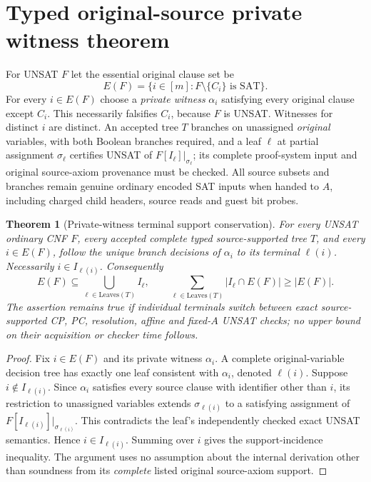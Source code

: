 \documentclass[11pt]{article}
\newtheorem{theorem}{Theorem}
\begin{document}
\section{Typed original-source private witness theorem}
For UNSAT $F$ let the essential original clause set be
\[
E(F)=\{i\in[m]:F\setminus\{C_i\}\text{ is SAT}\}.
\]
For every $i\in E(F)$ choose a \emph{private witness} $\alpha_i$ satisfying every original clause except $C_i$. This necessarily falsifies $C_i$, because $F$ is UNSAT. Witnesses for distinct $i$ are distinct. An accepted tree $T$ branches on unassigned \emph{original} variables, with both Boolean branches required, and a leaf $\ell$ at partial assignment $\sigma_\ell$ certifies UNSAT of $F[I_\ell]|_{\sigma_\ell}$; its complete proof-system input and original source-axiom provenance must be checked. All source subsets and branches remain genuine ordinary encoded SAT inputs when handed to $A$, including charged child headers, source reads and guest bit probes.

\begin{theorem}[Private-witness terminal support conservation]\label{th:mass}
For every UNSAT ordinary CNF $F$, every accepted complete typed source-supported tree $T$, and every $i\in E(F)$, follow the unique branch decisions of $\alpha_i$ to its terminal $\ell(i)$. Necessarily $i\in I_{\ell(i)}$. Consequently
\[
\boxed{E(F)\subseteq\bigcup_{\ell\in\mathrm{Leaves}(T)}I_\ell,\qquad
\sum_{\ell\in\mathrm{Leaves}(T)}|I_\ell\cap E(F)|\ge |E(F)|.}
\]
The assertion remains true if individual terminals switch between exact source-supported CP, PC, resolution, affine and fixed-$A$ UNSAT checks; no upper bound on their acquisition or checker time follows.
\end{theorem}
\begin{proof}
Fix $i\in E(F)$ and its private witness $\alpha_i$. A complete original-variable decision tree has exactly one leaf consistent with $\alpha_i$, denoted $\ell(i)$. Suppose $i\notin I_{\ell(i)}$. Since $\alpha_i$ satisfies every source clause with identifier other than $i$, its restriction to unassigned variables extends $\sigma_{\ell(i)}$ to a satisfying assignment of $F[I_{\ell(i)}]|_{\sigma_{\ell(i)}}$. This contradicts the leaf's independently checked exact UNSAT semantics. Hence $i\in I_{\ell(i)}$. Summing over $i$ gives the support-incidence inequality. The argument uses no assumption about the internal derivation other than soundness from its \emph{complete} listed original source-axiom support.
\end{proof}
\end{document}
